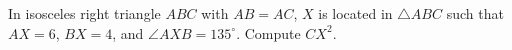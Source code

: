 In isosceles right triangle $ABC$ with $AB=AC$, $X$ is located in $\triangle ABC$ such that $AX=6$, $BX=4$, and $\angle AXB=135^{\circ}$. Compute $CX^2$.
